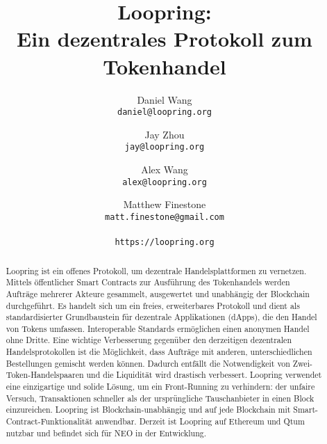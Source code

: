 \documentclass[UTF8,nofonts]{article}
\title{\textbf{Loopring:}\\\textbf{Ein dezentrales Protokoll zum Tokenhandel}}
\author{
 Daniel Wang\\
  \texttt{daniel@loopring.org}\\
  \and
  	Jay Zhou\\
  	\texttt{jay@loopring.org}\\
  	\and
  	Alex Wang\\
  	\texttt{alex@loopring.org}\\
  	\and
  	Matthew Finestone\\
  	\texttt{matt.finestone@gmail.com}\\ 
  \\
  \texttt{https://loopring.org}
 }
\begin{document}
\maketitle


\begin{abstract}
Loopring ist ein offenes Protokoll, um dezentrale Handelsplattformen zu vernetzen. Mittels öffentlicher Smart Contracts zur Ausführung des Tokenhandels werden Aufträge mehrerer Akteure gesammelt, ausgewertet und unabhängig der Blockchain durchgeführt. Es handelt sich um ein freies, erweiterbares Protokoll und dient als standardisierter Grundbaustein für dezentrale Applikationen (dApps), die den Handel von Tokens umfassen. Interoperable Standards ermöglichen einen anonymen Handel ohne Dritte. Eine wichtige Verbesserung gegenüber den derzeitigen dezentralen Handelsprotokollen ist die Möglichkeit, dass Aufträge mit anderen, unterschiedlichen Bestellungen gemischt werden können. Dadurch entfällt die Notwendigkeit von Zwei-Token-Handelspaaren und die Liquidität wird drastisch verbessert. Loopring verwendet eine einzigartige und solide Lösung, um ein Front-Running zu verhindern: der unfaire Versuch, Transaktionen schneller als der ursprüngliche Tauschanbieter in einen Block einzureichen. Loopring ist Blockchain-unabhängig und auf jede Blockchain mit Smart-Contract-Funktionalität anwendbar. Derzeit ist Loopring auf Ethereum \cite{buterin2017ethereum} \cite{wood2014ethereum} und Qtum \cite{dai2017smart} nutzbar und befindet sich für NEO \cite{atterlonn2018distributed} in der Entwicklung.
\end{abstract}
\end{document}
